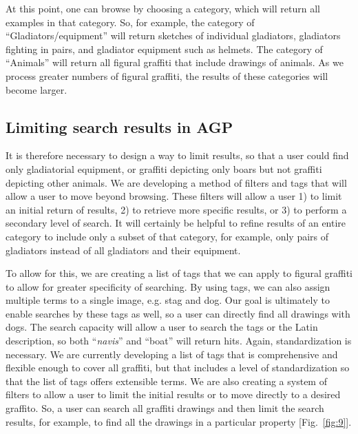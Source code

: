 \documentclass[amsthm,ebook]{saparticle}
\begin{document}
At this point, one can browse by choosing a category, which will return all examples in that category. So, for example,
the category of ``Gladiators/equipment'' will return sketches of individual gladiators, gladiators fighting in pairs, and
gladiator equipment such as helmets. The category of ``Animals'' will return all figural graffiti that include drawings
of animals. As we process greater numbers of figural graffiti, the results of these categories will become larger.


\subsection{Limiting search results in AGP}
\noindent It is therefore necessary to design a way to limit results, so that a user could find only gladiatorial equipment,
or graffiti depicting only boars but not graffiti depicting other animals. We are developing a method of filters and
tags that will allow a user to move beyond browsing. These filters will allow a user 1) to limit an initial return of
results, 2) to retrieve more specific results, or 3) to perform a secondary level of search. It will certainly be
helpful to refine results of an entire category to include only a subset of that category, for example, only pairs of
gladiators instead of all gladiators and their equipment.

To allow for this, we are creating a list of tags that we can apply to figural graffiti to allow for greater specificity
of searching. By using tags, we can also assign multiple terms to a single image, e.g. stag and dog. Our goal is
ultimately to enable searches by these tags as well, so a user can directly find all drawings with dogs. The search
capacity will allow a user to search the tags or the Latin description, so both ``\emph{navis}'' and ``boat'' will return hits.
Again, standardization is necessary. We are currently developing a list of tags that is comprehensive and flexible
enough to cover all graffiti, but that includes a level of standardization so that the list of tags offers extensible
terms. We are also creating a system of filters to allow a user to limit the initial results or to move directly to a
desired graffito. So, a user can search all graffiti drawings and then limit the search results, for example, to find
all the drawings in a particular property [Fig.~\ref{fig:9}].
\end{document}
